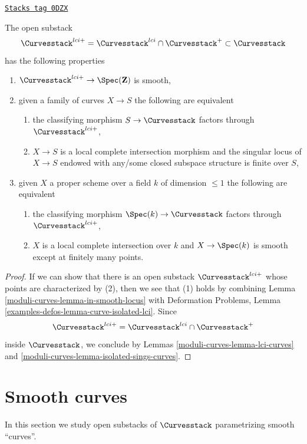 \begin{lemma}
\label{moduli-curves-lemma-big-smooth-part-curves}
\href{https://stacks.math.columbia.edu/tag/0DZX}{\texttt{Stacks tag 0DZX}}

The open substack
$$
\Curvesstack^{lci+} =
\Curvesstack^{lci} \cap \Curvesstack^{+}
\subset \Curvesstack
$$
has the following properties
\begin{enumerate}
\item $\Curvesstack^{lci+} \to \Spec(\mathbf{Z})$ is smooth,
\item given a family of curves $X \to S$ the following are equivalent
\begin{enumerate}
\item the classifying morphism $S \to \Curvesstack$ factors through
$\Curvesstack^{lci+}$,
\item $X \to S$ is a local complete intersection morphism and
the singular locus of $X \to S$ endowed with any/some closed subspace
structure is finite over $S$,
\end{enumerate}
\item given $X$ a proper scheme over a field $k$ of dimension $\leq 1$
the following are equivalent
\begin{enumerate}
\item the classifying morphism $\Spec(k) \to \Curvesstack$ factors
through $\Curvesstack^{lci+}$,
\item $X$ is a local complete intersection over $k$ and
$X \to \Spec(k)$ is smooth except at finitely many points.
\end{enumerate}
\end{enumerate}
\end{lemma}

\begin{proof}
If we can show that there is an open substack $\Curvesstack^{lci+}$
whose points are characterized by (2), then we see that
(1) holds by combining Lemma \ref{moduli-curves-lemma-in-smooth-locus} with
Deformation Problems, Lemma \ref{examples-defos-lemma-curve-isolated-lci}.
Since
$$
\Curvesstack^{lci+} = \Curvesstack^{lci} \cap \Curvesstack^{+}
$$
inside $\Curvesstack$, we conclude by
Lemmas \ref{moduli-curves-lemma-lci-curves} and \ref{moduli-curves-lemma-isolated-sings-curves}.
\end{proof}

\section{Smooth curves}
\label{moduli-curves-section-smooth-curves}
In this section we study open substacks of $\Curvesstack$
parametrizing smooth ``curves''.

